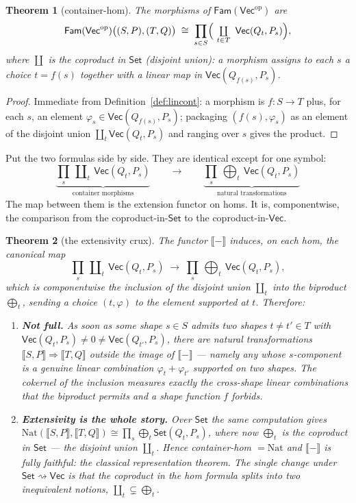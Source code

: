 \documentclass[11pt]{amsart}
\theoremstyle{plain}
\newtheorem{theorem}{Theorem}[section]
\theoremstyle{definition}
\renewcommand{\Vec}{\mathsf{Vec}}
\newcommand{\Set}{\mathsf{Set}}
\newcommand{\Fam}{\mathsf{Fam}}
\newcommand{\op}{\mathrm{op}}
\newcommand{\Nat}{\mathrm{Nat}}
\newcommand{\ext}[1]{\llbracket #1 \rrbracket}
\newcommand{\bul}{{-}}
\newcommand{\iso}{\cong}
\DeclareMathOperator{\dcoprod}{\textstyle\coprod}
\begin{document}
\begin{theorem}[container-hom]\label{thm:conthom}
The morphisms of $\Fam(\Vec^\op)$ are
\[
  \Fam(\Vec^\op)\bigl((S,P),(T,Q)\bigr)\;\iso\;
  \prod_{s\in S}\Bigl(\ \dcoprod_{t\in T}\ \Vec(Q_t,P_s)\Bigr),
\]
where $\dcoprod$ is the coproduct in $\Set$ (disjoint union): a morphism
assigns to each $s$ a choice $t=f(s)$ together with a linear map in
$\Vec(Q_{f(s)},P_s)$.
\end{theorem}

\begin{proof}
Immediate from Definition~\ref{def:lincont}: a morphism is $f\colon S\to T$
plus, for each $s$, an element $\varphi_s\in\Vec(Q_{f(s)},P_s)$; packaging
$(f(s),\varphi_s)$ as an element of the disjoint union $\dcoprod_t\Vec(Q_t,P_s)$
and ranging over $s$ gives the product.
\end{proof}

Put the two formulas side by side. They are identical except for one symbol:
\[
  \underbrace{\prod_{s}\ \dcoprod_{t}\ \Vec(Q_t,P_s)}_{\text{container morphisms}}
  \qquad\longrightarrow\qquad
  \underbrace{\prod_{s}\ \bigoplus_{t}\ \Vec(Q_t,P_s)}_{\text{natural transformations}}
\]
The map between them is the extension functor on homs. It is, componentwise, the
comparison from the coproduct-in-$\Set$ to the coproduct-in-$\Vec$.

\begin{theorem}[the extensivity crux]\label{thm:crux}
The functor $\ext{\bul}$ induces, on each hom, the canonical map
\[
  \prod_s\ \dcoprod_t\ \Vec(Q_t,P_s)\;\longrightarrow\;
  \prod_s\ \bigoplus_t\ \Vec(Q_t,P_s),
\]
which is componentwise the inclusion of the disjoint union $\dcoprod_t$ into the
biproduct $\bigoplus_t$, sending a choice $(t,\varphi)$ to the element supported
at $t$. Therefore:
\begin{enumerate}
\item \textbf{Not full.} As soon as some shape $s\in S$ admits two shapes
  $t\neq t'\in T$ with $\Vec(Q_t,P_s)\neq 0\neq\Vec(Q_{t'},P_s)$, there are
  natural transformations $\ext{S,P}\Rightarrow\ext{T,Q}$ outside the image of
  $\ext{\bul}$ --- namely any whose $s$-component is a genuine linear
  combination $\varphi_t+\varphi_{t'}$ supported on two shapes. The cokernel of
  the inclusion measures exactly the cross-shape linear combinations that the
  biproduct permits and a shape function $f$ forbids.
\item \textbf{Extensivity is the whole story.} Over $\Set$ the same computation
  gives $\Nat(\ext{S,P},\ext{T,Q})\iso\prod_s\bigoplus_t\Set(Q_t,P_s)$, where now
  $\bigoplus_t$ is the coproduct in $\Set$ --- the disjoint union $\dcoprod_t$.
  Hence container-hom $=\Nat$ and $\ext{\bul}$ is fully faithful: the classical
  representation theorem. The single change under $\Set\rightsquigarrow\Vec$ is
  that the coproduct in the hom formula splits into two inequivalent notions,
  $\dcoprod_t\subsetneq\bigoplus_t$.
\end{enumerate}
\end{theorem}
\end{document}
